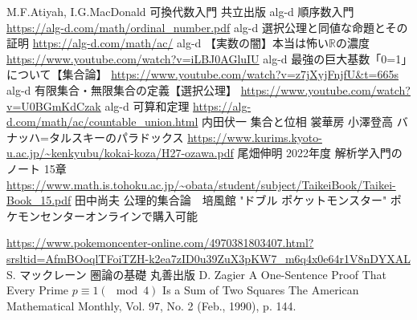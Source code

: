 \documentclass[dvipdfmx,a4paper,11pt]{article}
\newcommand{\R}{\mathbb{R}}
\theoremstyle{definition}
\begin{document}
 {\small
\begin{thebibliography}{n}
M.F.Atiyah,  I.G.MacDonald 可換代数入門 共立出版
alg-d 順序数入門
\url{https://alg-d.com/math/ordinal_number.pdf}
alg-d 選択公理と同値な命題とその証明
\url{https://alg-d.com/math/ac/}
alg-d 【実数の闇】本当は怖い$\R$の濃度
\url{https://www.youtube.com/watch?v=iLBJ0AGluIU}
alg-d 最強の巨大基数「0=1」について【集合論】
\url{https://www.youtube.com/watch?v=z7jXyjFnjfU&t=665s}
alg-d 有限集合・無限集合の定義【選択公理】
\url{https://www.youtube.com/watch?v=U0BGmKdCzak}
alg-d 可算和定理
\url{https://alg-d.com/math/ac/countable_union.html}
内田伏一 集合と位相 裳華房
小澤登高 バナッハ=タルスキーのパラドックス
\url{https://www.kurims.kyoto-u.ac.jp/~kenkyubu/kokai-koza/H27-ozawa.pdf}
尾畑伸明 2022年度 解析学入門のノート 15章
\url{https://www.math.is.tohoku.ac.jp/~obata/student/subject/TaikeiBook/Taikei-Book_15.pdf}
田中尚夫 公理的集合論　培風館
"ドブル ポケットモンスター" ポケモンセンターオンラインで購入可能

\url{https://www.pokemoncenter-online.com/4970381803407.html?srsltid=AfmBOoqlTFoiTZH-k2ea7zID0u39ZuX3pKW7_m6q4x0e64r1V8nDYXAL}
S. マックレーン 圏論の基礎 丸善出版
D. Zagier A One-Sentence Proof That Every Prime $p\equiv 1(\mod 4)$ Is a Sum of Two Squares
The American Mathematical Monthly, Vol. 97, No. 2 (Feb., 1990), p. 144.
\end{thebibliography}
}
 
 
\end{document}

